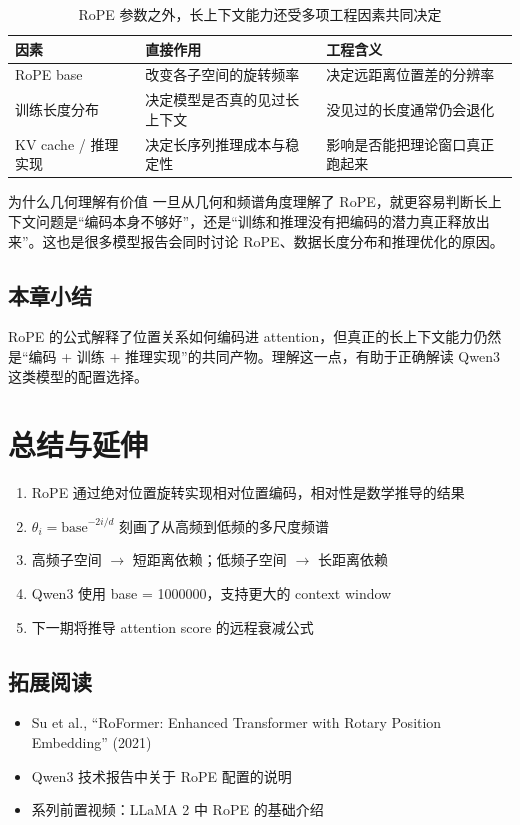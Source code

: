 \documentclass[a4paper]{article}
\begin{document}
\begin{table}[H]
\centering
\begin{tabular}{p{3.2cm}p{4.6cm}p{4.6cm}}
\toprule
因素 & 直接作用 & 工程含义 \\
\midrule
RoPE base & 改变各子空间的旋转频率 & 决定远距离位置差的分辨率 \\
训练长度分布 & 决定模型是否真的见过长上下文 & 没见过的长度通常仍会退化 \\
KV cache / 推理实现 & 决定长序列推理成本与稳定性 & 影响是否能把理论窗口真正跑起来 \\
\bottomrule
\end{tabular}
\caption{RoPE 参数之外，长上下文能力还受多项工程因素共同决定}
\end{table}

\begin{knowledgebox}{为什么几何理解有价值}
一旦从几何和频谱角度理解了 RoPE，就更容易判断长上下文问题是“编码本身不够好”，还是“训练和推理没有把编码的潜力真正释放出来”。这也是很多模型报告会同时讨论 RoPE、数据长度分布和推理优化的原因。
\end{knowledgebox}

\subsection{本章小结}
RoPE 的公式解释了位置关系如何编码进 attention，但真正的长上下文能力仍然是“编码 + 训练 + 推理实现”的共同产物。理解这一点，有助于正确解读 Qwen3 这类模型的配置选择。

\section{总结与延伸}

\begin{enumerate}
  \item RoPE 通过绝对位置旋转实现相对位置编码，相对性是数学推导的结果
  \item $\theta_i = \text{base}^{-2i/d}$ 刻画了从高频到低频的多尺度频谱
  \item 高频子空间 $\to$ 短距离依赖；低频子空间 $\to$ 长距离依赖
  \item Qwen3 使用 base = 1000000，支持更大的 context window
  \item 下一期将推导 attention score 的远程衰减公式
\end{enumerate}

\subsection{拓展阅读}
\begin{itemize}
  \item Su et al., ``RoFormer: Enhanced Transformer with Rotary Position Embedding'' (2021)
  \item Qwen3 技术报告中关于 RoPE 配置的说明
  \item 系列前置视频：LLaMA 2 中 RoPE 的基础介绍
\end{itemize}
\end{document}
